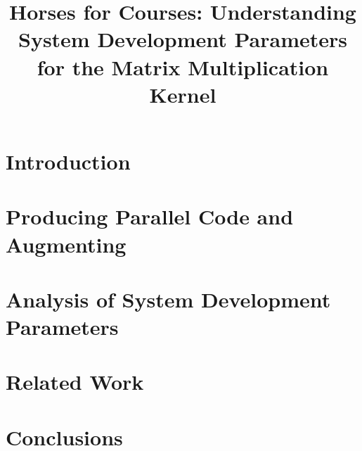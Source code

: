 \documentclass[conference]{IEEEtran}
\begin{document}
\pagestyle{plain}
\title{Horses for Courses: Understanding System Development Parameters for the Matrix Multiplication Kernel
 \\
}
\begin{comment}
\author{\IEEEauthorblockN{Vyuhita Bonthu}
\IEEEauthorblockA{\textit{Indian Institute of Technology Dharwad, India} \\
\textit{212011001@iitdh.ac.in}}
\and
\IEEEauthorblockN{Nikhil Hegde}
\IEEEauthorblockA{\textit{Indian Institute of technology Dharwad, India} \\
\textit{nikhilh@iitdh.ac.in}}
}
\end{comment}
\maketitle

\begin{abstract}

\end{abstract}



\section{Introduction}


\section{Producing Parallel Code and Augmenting}


\section{Analysis of System Development Parameters}



\section{Related Work}



\section{Conclusions}





\end{document}
